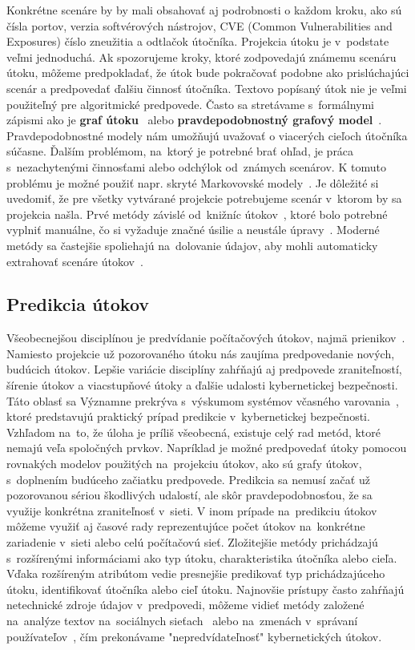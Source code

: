 \documentclass[thesismargins, thesislinespacing, openright, upjsfrontpage]{rnthesis}
\begin{document}
Konkrétne scenáre by by mali obsahovať aj podrobnosti o každom kroku, ako sú čísla portov, verzia softvérových nástrojov, CVE (Common Vulnerabilities and Exposures) číslo zneužitia a odtlačok útočníka. Projekcia útoku je v~podstate veľmi jednoduchá. Ak spozorujeme kroky, ktoré zodpovedajú známemu scenáru útoku, môžeme predpokladať, že útok bude pokračovať podobne ako prislúchajúci scenár a predpovedať ďalšiu činnosť útočníka. Textovo popísaný útok nie je veľmi použiteľný pre algoritmické predpovede. Často sa stretávame s~formálnymi zápismi ako je \textbf{graf útoku}~\cite{hughes2003attack} alebo \textbf{pravdepodobnostný grafový model}~\cite{qin2004attack}. Pravdepodobnostné modely nám umožňujú uvažovať o viacerých cieľoch útočníka súčasne. Ďalším problémom, na~ktorý je potrebné brať ohľad, je práca s~nezachytenými činnosťami alebo odchýlok od~známych scenárov. K tomuto problému je možné použiť napr. skryté Markovovské modely~\cite{farhadi2011alert}. Je dôležité si uvedomiť, že pre všetky vytvárané projekcie potrebujeme scenár v~ktorom by sa projekcia našla. Prvé metódy závislé od~knižníc útokov~\cite{qin2004attack}, ktoré bolo potrebné vyplniť manuálne, čo si vyžaduje značné úsilie a neustále úpravy~\cite{Yang2014}. Moderné metódy sa častejšie spoliehajú na~dolovanie údajov, aby mohli automaticky extrahovať scenáre útokov~\cite{li2007data,farhadi2011alert,kim2014study}.

\subsection{Predikcia útokov}

Všeobecnejšou disciplínou je predvídanie počítačových útokov, najmä prienikov~\cite{Abdlhamed2017}. Namiesto projekcie už pozorovaného útoku nás zaujíma predpovedanie nových, budúcich útokov. Lepšie variácie disciplíny zahŕňajú aj predpovede zraniteľností, šírenie útokov a viacstupňové útoky a ďalšie udalosti kybernetickej bezpečnosti. Táto oblasť sa Významne prekrýva s~výskumom systémov včasného varovania~\cite{ramaki2016survey}, ktoré predstavujú praktický prípad predikcie v~kybernetickej bezpečnosti. Vzhľadom na~to, že úloha je príliš všeobecná, existuje celý rad metód, ktoré nemajú veľa spoločných prvkov. Napríklad je možné predpovedať útoky pomocou rovnakých modelov použitých na~projekciu útokov, ako sú grafy útokov, s~doplnením budúceho začiatku predpovede. Predikcia sa nemusí začať už pozorovanou sériou škodlivých udalostí, ale skôr pravdepodobnosťou, že sa využije konkrétna zraniteľnosť v~sieti. 
V inom prípade na~predikciu útokov môžeme využiť aj časové rady reprezentujúce počet útokov na~konkrétne zariadenie v~sieti alebo celú počítačovú sieť. Zložitejšie metódy prichádzajú s~rozšírenými informáciami ako typ útoku, charakteristika útočníka alebo cieľa. Vďaka rozšíreným atribútom vedie presnejšie predikovať typ prichádzajúceho útoku, identifikovať útočníka alebo cieľ útoku. Najnovšie prístupy často zahŕňajú netechnické zdroje údajov v~predpovedi, môžeme vidieť metódy založené na~analýze textov na~sociálnych sieťach~\cite{hernandez2016security,shu2018understanding} alebo na~zmenách v~správaní používateľov~\cite{shao2016transparent}, čím prekonávame "nepredvídateľnosť" kybernetických útokov.
\end{document}
